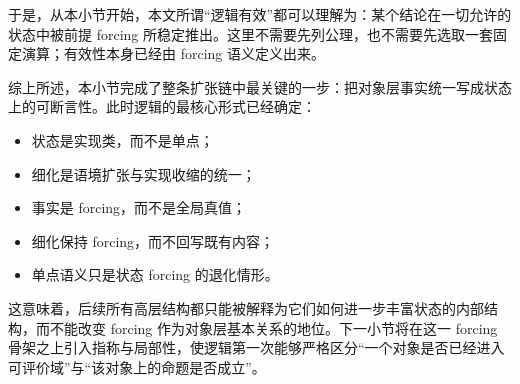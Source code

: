 于是，从本小节开始，本文所谓“逻辑有效”都可以理解为：某个结论在一切允许的状态中被前提 forcing 所稳定推出。这里不需要先列公理，也不需要先选取一套固定演算；有效性本身已经由 forcing 语义定义出来。

综上所述，本小节完成了整条扩张链中最关键的一步：把对象层事实统一写成状态上的可断言性。此时逻辑的最核心形式已经确定：
\begin{itemize}
  \item 状态是实现类，而不是单点；
  \item 细化是语境扩张与实现收缩的统一；
  \item 事实是 forcing，而不是全局真值；
  \item 细化保持 forcing，而不回写既有内容；
  \item 单点语义只是状态 forcing 的退化情形。
\end{itemize}
这意味着，后续所有高层结构都只能被解释为它们如何进一步丰富状态的内部结构，而不能改变 forcing 作为对象层基本关系的地位。下一小节将在这一 forcing 骨架之上引入指称与局部性，使逻辑第一次能够严格区分“一个对象是否已经进入可评价域”与“该对象上的命题是否成立”。
